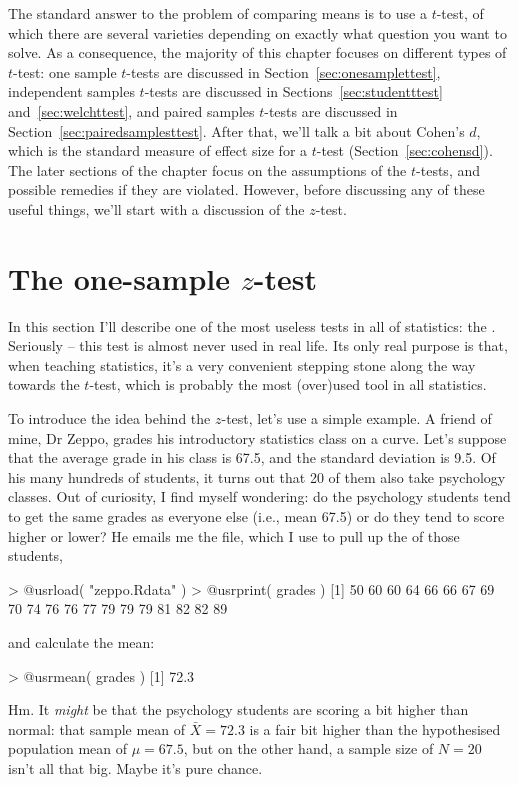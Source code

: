 The standard answer to the problem of comparing means is to use a $t$-test, of which there are several varieties depending on exactly what question you want to solve. As a consequence, the majority of this chapter focuses on different types of $t$-test: one sample $t$-tests are discussed in Section~\ref{sec:onesamplettest}, independent samples $t$-tests are discussed in Sections~\ref{sec:studentttest} and~\ref{sec:welchttest}, and paired samples $t$-tests are discussed in Section~\ref{sec:pairedsamplesttest}. After that, we'll talk a bit about Cohen's $d$, which is the standard measure of effect size for a $t$-test (Section~\ref{sec:cohensd}). The later sections of the chapter focus on the assumptions of the $t$-tests, and possible remedies if they are violated. However, before discussing any of these useful things, we'll start with a discussion of the $z$-test. 


\section{The one-sample $z$-test}

In this section I'll describe one of the most useless tests in all of statistics: the . Seriously -- this test is almost never used in real life. Its only real purpose is that, when teaching statistics, it's a very convenient stepping stone along the way towards the $t$-test, which is probably the most (over)used tool in all statistics.


To introduce the idea behind the $z$-test, let's use a simple example. A friend of mine, Dr Zeppo, grades his introductory statistics class on a curve. Let's suppose that the average grade in his class is 67.5, and the standard deviation is 9.5. Of his many hundreds of students, it turns out that 20 of them also take psychology classes. Out of curiosity, I find myself wondering: do the psychology students tend to get the same grades as everyone else (i.e., mean 67.5) or do they tend to score higher or lower? He emails me the  file, which I use to pull up the  of those students, 
\begin{rblock1}
> @usr{load( "zeppo.Rdata" )} 
> @usr{print( grades )}
 [1] 50 60 60 64 66 66 67 69 70 74 76 76 77 79 79 79 81 82 82 89
\end{rblock1} 
and calculate the mean:
\begin{rblock1}
> @usr{mean( grades )}
[1] 72.3
\end{rblock1}
Hm. It {\it might} be that the psychology students are scoring a bit higher than normal: that sample mean of $\bar{X} = 72.3$ is a fair bit higher than the hypothesised population mean of $\mu = 67.5$, but on the other hand, a sample size of $N = 20$ isn't all that big. Maybe it's pure chance. 

